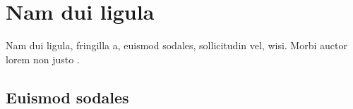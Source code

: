 \documentclass[12pt]{report}
\begin{document}
\clearpage
\linenumbers %
\modulolinenumbers[3] %
\chapter{Nam dui ligula}
\lipsum[2-2] Nam dui ligula, fringilla a, euismod sodales, sollicitudin vel, wisi. Morbi
auctor lorem non justo \citep{lamport1986latex}.
\section{Euismod sodales}
\lipsum[2-3]









\end{document}
